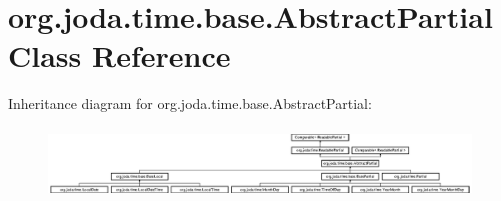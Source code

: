 \hypertarget{classorg_1_1joda_1_1time_1_1base_1_1_abstract_partial}{\section{org.\-joda.\-time.\-base.\-Abstract\-Partial Class Reference}
\label{classorg_1_1joda_1_1time_1_1base_1_1_abstract_partial}
}
Inheritance diagram for org.\-joda.\-time.\-base.\-Abstract\-Partial\-:\begin{figure}[H]
\begin{center}
\leavevmode
\includegraphics[height=1.895735cm]{classorg_1_1joda_1_1time_1_1base_1_1_abstract_partial}
\end{center}
\end{figure}
